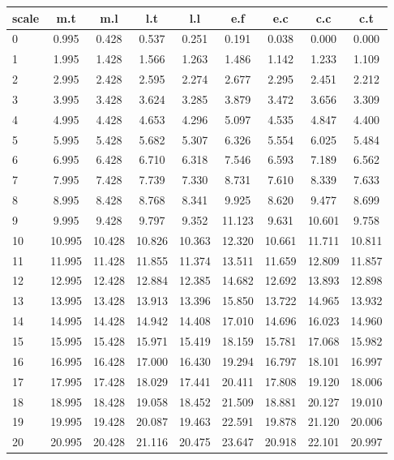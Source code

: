 \begin{tabular}{lcccccccc}
\hline
scale & m.t & m.l & l.t & l.l & e.f & e.c & c.c & c.t \\
\hline
 0	&	 0.995	&	 0.428	&	 0.537	&	 0.251	&	 0.191	&	 0.038	&	 0.000	 &	 0.000	\\
 1	&	 1.995	&	 1.428	&	 1.566	&	 1.263	&	 1.486	&	 1.142	&	 1.233	&	 1.109	\\
 2	&	 2.995	&	 2.428	&	 2.595	&	 2.274	&	 2.677	&	 2.295	&	 2.451	&	 2.212	\\
 3	&	 3.995	&	 3.428	&	 3.624	&	 3.285	&	 3.879	&	 3.472	&	 3.656	&	 3.309	\\
 4	&	 4.995	&	 4.428	&	 4.653	&	 4.296	&	 5.097	&	 4.535	&	 4.847	&	 4.400	\\
 5	&	 5.995	&	 5.428	&	 5.682	&	 5.307	&	 6.326	&	 5.554	&	 6.025	&	 5.484	\\
 6	&	 6.995	&	 6.428	&	 6.710	&	 6.318	&	 7.546	&	 6.593	&	 7.189	&	 6.562	\\
 7	&	 7.995	&	 7.428	&	 7.739	&	 7.330	&	 8.731	&	 7.610	&	 8.339	&	 7.633	\\
 8	&	 8.995	&	 8.428	&	 8.768	&	 8.341	&	 9.925	&	 8.620	&	 9.477	&	 8.699	\\
 9	&	 9.995	&	 9.428	&	 9.797	&	 9.352	&	11.123	&	 9.631	&	 10.601	&	 9.758	\\
10	&	10.995	&	10.428	&	10.826	&	10.363	&	12.320	&	10.661	&	 11.711	&	10.811	\\
11	&	11.995	&	11.428	&	11.855	&	11.374	&	13.511	&	11.659	&	 12.809	&	11.857	\\
12	&	12.995	&	12.428	&	12.884	&	12.385	&	14.682	&	12.692	&	 13.893	&	12.898	\\
13	&	13.995	&	13.428	&	13.913	&	13.396	&	15.850	&	13.722	&	 14.965	&	13.932	\\
14	&	14.995	&	14.428	&	14.942	&	14.408	&	17.010	&	14.696	&	 16.023	&	14.960	\\
15	&	15.995	&	15.428	&	15.971	&	15.419	&	18.159	&	15.781	&	 17.068	&	15.982	\\
16	&	16.995	&	16.428	&	17.000	&	16.430	&	19.294	&	16.797	&	 18.101	&	16.997	\\
17	&	17.995	&	17.428	&	18.029	&	17.441	&	20.411	&	17.808	&	 19.120	&	18.006	\\
18	&	18.995	&	18.428	&	19.058	&	18.452	&	21.509	&	18.881	&	 20.127	&	19.010	\\
19	&	19.995	&	19.428	&	20.087	&	19.463	&	22.591	&	19.878	&	 21.120	&	20.006	\\
20	&	20.995	&	20.428	&	21.116	&	20.475	&	23.647	&	20.918	&	 22.101	&	20.997	\\

\end{tabular}
